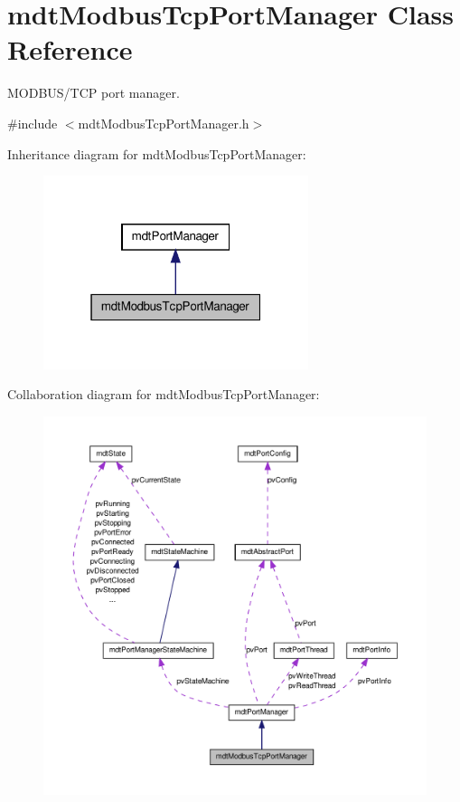 \hypertarget{classmdt_modbus_tcp_port_manager}{
\section{mdtModbusTcpPortManager Class Reference}
\label{classmdt_modbus_tcp_port_manager}
}


MODBUS/TCP port manager.  




{\ttfamily \#include $<$mdtModbusTcpPortManager.h$>$}



Inheritance diagram for mdtModbusTcpPortManager:\nopagebreak
\begin{figure}[H]
\begin{center}
\leavevmode
\includegraphics[width=220pt]{classmdt_modbus_tcp_port_manager__inherit__graph}
\end{center}
\end{figure}


Collaboration diagram for mdtModbusTcpPortManager:\nopagebreak
\begin{figure}[H]
\begin{center}
\leavevmode
\includegraphics[width=400pt]{classmdt_modbus_tcp_port_manager__coll__graph}
\end{center}
\end{figure}
